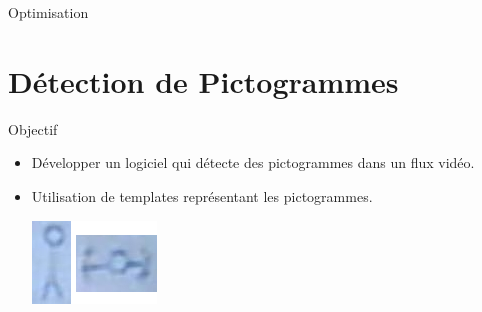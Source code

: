 \documentclass[t,14pt]{beamer}
\begin{document}
%
%
%


\vspace{5mm}
\begin{frame}{Optimisation}
\vspace{5mm}
\end{frame}

\section[Détection de Pictogrammes]{Détection de Pictogrammes}
\begin{frame}{Objectif}
\vspace{5mm}
\begin{itemize}
\item Développer un logiciel qui détecte des pictogrammes dans un flux vidéo.
\item Utilisation de templates représentant les pictogrammes.
\vspace{5mm}
\begin{center}
\includegraphics[scale=0.66]{images/templates.png}
\end{center}
\end{itemize}
\end{frame}
\end{document}
